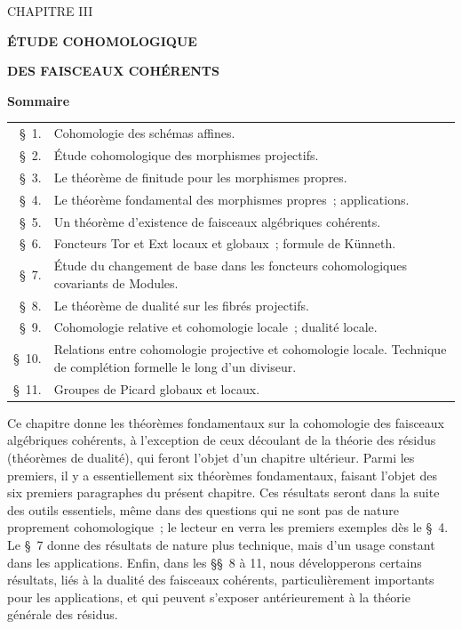 \label{chapter:III-fr}

\begin{center}
{\large CHAPITRE III\par}
\vspace{1.5em}
{\Large\bfseries ÉTUDE COHOMOLOGIQUE\par}
{\Large\bfseries DES FAISCEAUX COHÉRENTS\par}
\vspace{1.8em}
{\bfseries Sommaire\par}
\end{center}

\medskip
\begin{tabular}{@{}r@{\ }p{}@{}}
\S~1. & Cohomologie des schémas affines.\\
\S~2. & Étude cohomologique des morphismes projectifs.\\
\S~3. & Le théorème de finitude pour les morphismes propres.\\
\S~4. & Le théorème fondamental des morphismes propres~; applications.\\
\S~5. & Un théorème d'existence de faisceaux algébriques cohérents.\\
\S~6. & Foncteurs Tor et Ext locaux et globaux~; formule de Künneth.\\
\S~7. & Étude du changement de base dans les foncteurs cohomologiques
covariants de Modules.\\
\S~8. & Le théorème de dualité sur les fibrés projectifs.\\
\S~9. & Cohomologie relative et cohomologie locale~; dualité locale.\\
\S~10. & Relations entre cohomologie projective et cohomologie locale.
Technique de complétion formelle le long d'un diviseur.\\
\S~11. & Groupes de Picard globaux et locaux\footnotemark.
\end{tabular}

\medskip
Ce chapitre donne les théorèmes fondamentaux sur la cohomologie des faisceaux
algébriques cohérents, à l'exception de ceux découlant de la théorie des
résidus (théorèmes de dualité), qui feront l'objet d'un chapitre ultérieur.
Parmi les premiers, il y a essentiellement six théorèmes fondamentaux,
faisant l'objet des six premiers paragraphes du présent chapitre. Ces
résultats seront dans la suite des outils essentiels, même dans des questions
qui ne sont pas de nature proprement cohomologique~; le lecteur en verra les
premiers exemples dès le \S~4. Le \S~7 donne des résultats de nature plus
technique, mais d'un usage constant dans les applications. Enfin, dans les
\S\S~8 à 11, nous développerons certains résultats, liés à la dualité des
faisceaux cohérents, particulièrement importants pour les applications, et
qui peuvent s'exposer antérieurement à la théorie générale des résidus.


